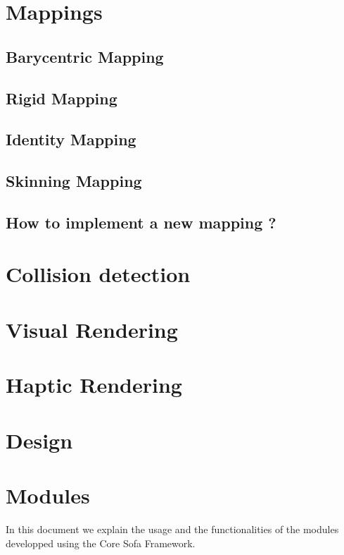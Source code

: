 \documentclass[a4paper,10pt]{report}
\begin{document}
\chapter{Mappings}

\section{Barycentric Mapping}
\section{Rigid Mapping}
\section{Identity Mapping}
\section{Skinning Mapping}

\section{How to implement a new mapping ?}

\chapter{Collision detection}


\chapter{Visual Rendering}


\chapter{Haptic Rendering}



\chapter{Design}
\graphicspath{{../design/}}  %



\chapter{Modules}
\graphicspath{{../modules/}}  %
In this document we explain the usage and the functionalities of the modules developped using the Core Sofa Framework.

\end{document}
